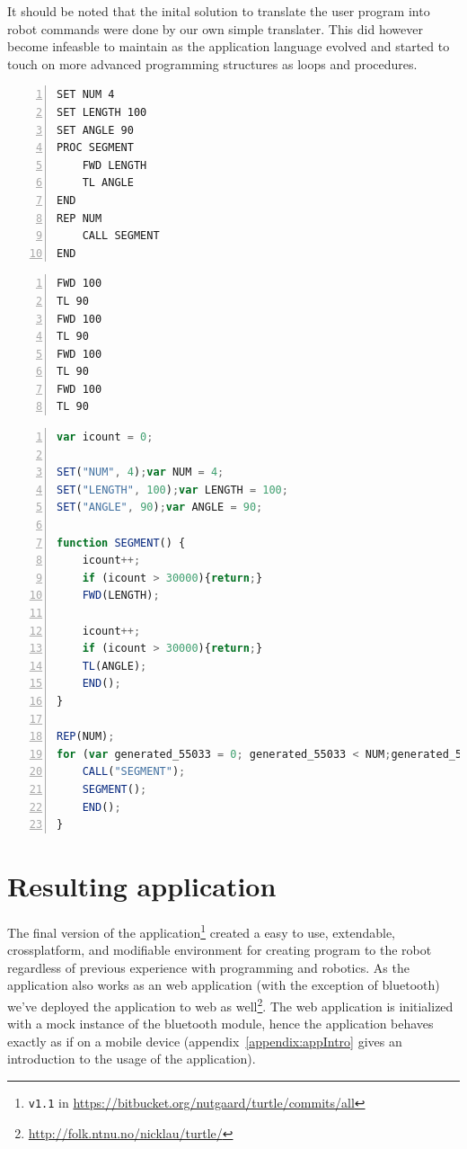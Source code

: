 \bigskip\noindent
It should be noted that the inital solution to translate the user program into robot commands were done by our own simple translater. This did however become infeasble to maintain as the application language evolved and started to touch on more advanced programming structures as loops and procedures.  

\begin{minipage}{\linewidth}
	\begin{lstlisting}[frame=single,numbers=left,caption={Example code for creating a square using variables (Extended language), procedures and loop.},language=MyBasic,label=lst:loop]
SET NUM 4
SET LENGTH 100
SET ANGLE 90
PROC SEGMENT
    FWD LENGTH
    TL ANGLE
END 
REP NUM
    CALL SEGMENT
END 
	\end{lstlisting}
	\begin{lstlisting}[frame=single,numbers=left,caption={Commands sent to simulator(Kernel language)},language=MyBasic,label=lst:commands]
FWD 100
TL 90
FWD 100
TL 90
FWD 100
TL 90
FWD 100
TL 90
	\end{lstlisting}
\end{minipage}
\begin{minipage}{\linewidth}
	\begin{lstlisting}[frame=single,numbers=left,caption={The internal representation of the previous program.},language=Javascript,label=lst:internal]
var icount = 0; 

SET("NUM", 4);var NUM = 4; 
SET("LENGTH", 100);var LENGTH = 100; 
SET("ANGLE", 90);var ANGLE = 90; 

function SEGMENT() { 
	icount++; 
	if (icount > 30000){return;} 
	FWD(LENGTH); 

	icount++; 
	if (icount > 30000){return;} 
	TL(ANGLE); 
	END();
} 

REP(NUM);
for (var generated_55033 = 0; generated_55033 < NUM;generated_55033++) { 
	CALL("SEGMENT");
	SEGMENT(); 
	END();
}
	\end{lstlisting}
\end{minipage}

\section{Resulting application}
The final version of the application\footnote{\texttt{v1.1} in \url{https://bitbucket.org/nutgaard/turtle/commits/all}} created a easy to use, extendable, crossplatform, and modifiable environment for creating program to the robot regardless of previous experience with programming and robotics. As the application also works as an web application (with the exception of bluetooth) we've deployed the application to web as well\footnote{\url{http://folk.ntnu.no/nicklau/turtle/}}. The web application is initialized with a mock instance of the bluetooth module, hence the application behaves exactly as if on a mobile device (appendix~\ref{appendix:appIntro} gives an introduction to the usage of the application). 

